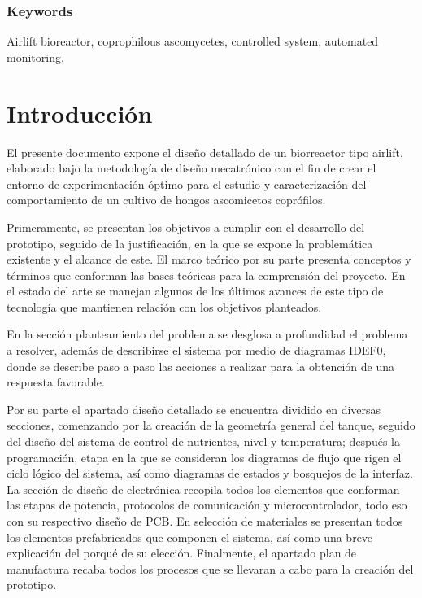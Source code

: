 \documentclass[11pt,tesis,twoside,openright,spanish]{upiiztt}
\begin{document}
{\subsection*{Keywords}\label{keywords}

Airlift bioreactor, coprophilous ascomycetes, controlled system, automated monitoring.
}
\clearpage{}

\clearpage\pagestyle{plain}
\chapter{Introducción}\label{cap1}

El presente documento expone el diseño detallado de un biorreactor tipo airlift,
elaborado bajo la metodología de diseño mecatrónico con el fin de crear el entorno
de experimentación óptimo para el estudio y caracterización del comportamiento de
un cultivo de hongos ascomicetos coprófilos.

Primeramente, se presentan los objetivos a cumplir con el desarrollo del prototipo,
seguido de la justificación, en la que se expone la problemática existente y el
alcance de este. El marco teórico por su parte presenta conceptos y términos que
conforman las bases teóricas para la comprensión del proyecto. En el estado del
arte se manejan algunos de los últimos avances de este tipo de tecnología que
mantienen relación con los objetivos planteados.

En la sección planteamiento del problema se desglosa a profundidad el problema
a resolver, además de describirse el sistema por medio de diagramas IDEF0, donde
se describe paso a paso las acciones a realizar para la obtención de una respuesta
favorable.

Por su parte el apartado diseño detallado se encuentra dividido en diversas
secciones, comenzando por la creación de la geometría general del tanque,
seguido del diseño del sistema de control de nutrientes, nivel y temperatura;
después la programación, etapa en la que se consideran los diagramas de flujo que
rigen el ciclo lógico del sistema, así como diagramas de estados y bosquejos de la
interfaz. La sección de diseño de electrónica recopila todos los elementos que
conforman las etapas de potencia, protocolos de comunicación y microcontrolador,
todo eso con su respectivo diseño de PCB. En selección de materiales se presentan
todos los elementos prefabricados que componen el sistema, así como una breve
explicación del porqué de su elección. Finalmente, el apartado plan de manufactura
recaba todos los procesos que se llevaran a cabo para la creación del prototipo.
\end{document}
